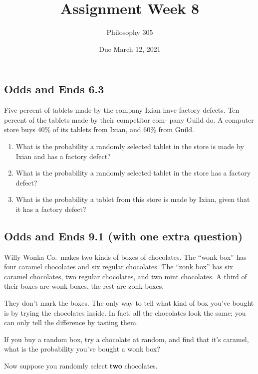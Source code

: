 \documentclass[
  11pt,
]{article}
\title{Assignment Week 8}
\author{Philosophy 305}
\date{Due March 12, 2021}
\providecommand{\tightlist}{%
  \setlength{\itemsep}{0pt}\setlength{\parskip}{0pt}}
\begin{document}
\maketitle

\hypertarget{odds-and-ends-6.3}{%
\subsection{Odds and Ends 6.3}\label{odds-and-ends-6.3}}

Five percent of tablets made by the company Ixian have factory defects.
Ten percent of the tablets made by their competitor com- pany Guild do.
A computer store buys 40\% of its tablets from Ixian, and 60\% from
Guild.

\begin{enumerate}
\def\labelenumi{\alph{enumi}.}
\tightlist
\item
  What is the probability a randomly selected tablet in the store is
  made by Ixian and has a factory defect?
\item
  What is the probability a randomly selected tablet in the store has a
  factory defect?
\item
  What is the probability a tablet from this store is made by Ixian,
  given that it has a factory defect?
\end{enumerate}

\hypertarget{odds-and-ends-9.1-with-one-extra-question}{%
\subsection{Odds and Ends 9.1 (with one extra
question)}\label{odds-and-ends-9.1-with-one-extra-question}}

Willy Wonka Co.~makes two kinds of boxes of chocolates. The ``wonk box''
has four caramel chocolates and six regular chocolates. The ``zonk box''
has six caramel chocolates, two regular chocolates, and two mint
chocolates. A third of their boxes are wonk boxes, the rest are zonk
boxes.

They don't mark the boxes. The only way to tell what kind of box you've
bought is by trying the chocolates inside. In fact, all the chocolates
look the same; you can only tell the difference by tasting them.

If you buy a random box, try a chocolate at random, and find that it's
caramel, what is the probability you've bought a wonk box?

Now suppose you randomly select \textbf{two} chocolates.
\end{document}
